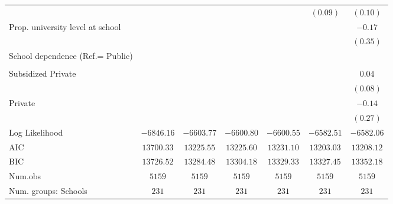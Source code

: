 \documentclass[
  12pt,
  letterpaper,
]{article}
\begin{document}
\begin{table}
{\begin{center}
{\begin{threeparttable}
\begin{tabular}{l c c c c c c}
                                                       &               &               &               &               & $(0.09)$      & $(0.10)$      \\
Prop. university level at school                       &               &               &               &               &               & $-0.17$       \\
                                                       &               &               &               &               &               & $(0.35)$      \\
School dependence (Ref.= Public)                       &               &               &               &               &               &               \\
                                                       &               &               &               &               &               &               \\
\quad Subsidized Private                               &               &               &               &               &               & $0.04$        \\
                                                       &               &               &               &               &               & $(0.08)$      \\
\quad Private                                          &               &               &               &               &               & $-0.14$       \\
                                                       &               &               &               &               &               & $(0.27)$      \\
\midrule
Log Likelihood                                         & $-6846.16$    & $-6603.77$    & $-6600.80$    & $-6600.55$    & $-6582.51$    & $-6582.06$    \\
AIC                                                    & $13700.33$    & $13225.55$    & $13225.60$    & $13231.10$    & $13203.03$    & $13208.12$    \\
BIC                                                    & $13726.52$    & $13284.48$    & $13304.18$    & $13329.33$    & $13327.45$    & $13352.18$    \\
Num.obs                                                & $5159$        & $5159$        & $5159$        & $5159$        & $5159$        & $5159$        \\
Num. groups: Schools                                   & $231$         & $231$         & $231$         & $231$         & $231$         & $231$         \\

\end{tabular}
\end{threeparttable}}
\end{center}}
\end{table}
\end{document}
